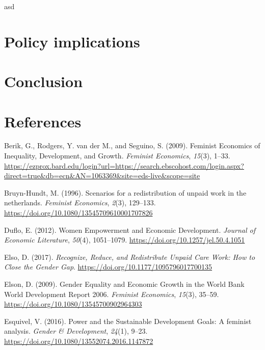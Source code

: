 \documentclass[
  11pt,
]{article}
\newlength{\cslhangindent}
\newenvironment{CSLReferences}[2] %
 {\begin{list}{}{%
  \setlength{\itemindent}{0pt}
  \setlength{\leftmargin}{0pt}
  \setlength{\parsep}{0pt}
  \ifodd #1
   \setlength{\leftmargin}{\cslhangindent}
   \setlength{\itemindent}{-1\cslhangindent}
  \fi
  \setlength{\itemsep}{#2\baselineskip}}}
 {\end{list}}
\begin{document}
asd

\section{Policy implications}\label{policy-implications}

\section{Conclusion}\label{conclusion}

\section*{References}\label{sec-ref}

\label{refs}
\begin{CSLReferences}{1}{0}
Berik, G., Rodgers, Y. van der M., and Seguino, S. (2009). Feminist
{Economics} of {Inequality}, {Development}, and {Growth}. \emph{Feminist
Economics}, \emph{15}(3), 1--33.
\url{https://ezprox.bard.edu/login?url=https://search.ebscohost.com/login.aspx?direct=true&db=ecn&AN=1063369&site=eds-live&scope=site}

Bruyn-Hundt, M. (1996). Scenarios for a redistribution of unpaid work in
the netherlands. \emph{Feminist Economics}, \emph{2}(3), 129--133.
\url{https://doi.org/10.1080/13545709610001707826}

Duflo, E. (2012). Women {Empowerment} and {Economic} {Development}.
\emph{Journal of Economic Literature}, \emph{50}(4), 1051--1079.
\url{https://doi.org/10.1257/jel.50.4.1051}

Elso, D. (2017). \emph{Recognize, {Reduce}, and {Redistribute} {Unpaid}
{Care} {Work}: {How} to {Close} the {Gender} {Gap}}.
\url{https://doi.org/10.1177/1095796017700135}

Elson, D. (2009). Gender {Equality} and {Economic} {Growth} in the
{World} {Bank} {World} {Development} {Report} 2006. \emph{Feminist
Economics}, \emph{15}(3), 35--59.
\url{https://doi.org/10.1080/13545700902964303}

Esquivel, V. (2016). Power and the {Sustainable} {Development} {Goals}:
A feminist analysis. \emph{Gender \& Development}, \emph{24}(1), 9--23.
\url{https://doi.org/10.1080/13552074.2016.1147872}


\end{CSLReferences}
\end{document}
